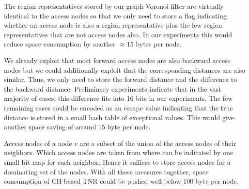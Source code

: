 \documentclass{llncs}
\begin{document}
The region representatives stored by our graph Voronoi filter are virtually identical to the access nodes so that we only need to store a flag indicating whether an access node is also a region representative plus the few region representatives that are not access nodes also. 
In our experiments this would reduce space consumption by another $\approx15$ bytes per node. 

We already exploit that most forward access nodes are also backward access nodes but we could additionally exploit that the corresponding distances are also similar. 
Thus, we only need to store the forward distance and the difference to the backward distance. 
Preliminary experiments indicate that in the vast majority of cases, this difference fits into 16 bits in our experiments. 
The few remaining cases could be encoded as an escape value indicating that the true distance is stored in a small hash table of exceptional values. 
This would give another space saving of around $15$ byte per node.

Access nodes of a node $v$ are a subset of the union of the access nodes of their neighbors. 
Which access nodes are taken from where can be indicated by one small bit map for each neighbor. 
Hence it suffices to store access nodes for a dominating set of the nodes.
With all these measures together, space consumption of CH-based TNR could be pushed well below 100 byte per node.




\clearpage
\end{document}
